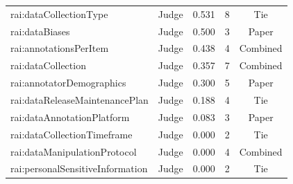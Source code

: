 \begin{table}[h]
\begin{tabular}{llccc}
\quad rai:dataCollectionType & Judge & 0.531 & 8 & Tie \\
\quad rai:dataBiases & Judge & 0.500 & 3 & Paper \\
\quad rai:annotationsPerItem & Judge & 0.438 & 4 & Combined \\
\quad rai:dataCollection & Judge & 0.357 & 7 & Combined \\
\quad rai:annotatorDemographics & Judge & 0.300 & 5 & Paper \\
\quad rai:dataReleaseMaintenancePlan & Judge & 0.188 & 4 & Tie \\
\quad rai:dataAnnotationPlatform & Judge & 0.083 & 3 & Paper \\
\quad rai:dataCollectionTimeframe & Judge & 0.000 & 2 & Tie \\
\quad rai:dataManipulationProtocol & Judge & 0.000 & 4 & Combined \\
\quad rai:personalSensitiveInformation & Judge & 0.000 & 2 & Tie \\
\bottomrule
\end{tabular}
\end{table}
